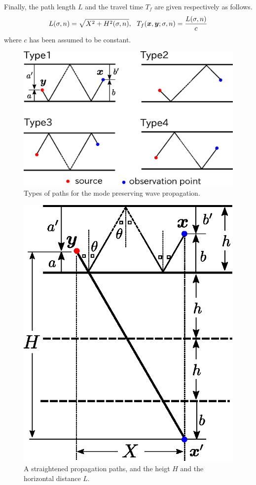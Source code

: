 ﻿\documentclass[11pt,a4j]{article}
\begin{document}
Finally, the path length $L$ and the travel time $T_f$ are 
 given respectively as follows.
\begin{equation}
	L(\sigma ,n)=\sqrt{X^2+ H^2(\sigma ,n)}, \ \ 
	T_f(\fat{x},\fat{y};\sigma,n)=\frac{L(\sigma,n)}{c}
	\label{eqn:}
\end{equation}
where $c$ has been assumed to be constant.
\begin{figure}[h]
	\begin{center}
	\includegraphics[width=0.7\linewidth]{paths.eps} 
	\end{center}
	\caption{
		Types of paths for the mode preserving wave propagation. 
	} 
	\label{fig:fig1}
\end{figure}
\begin{figure}[h]
	\begin{center}
	\includegraphics[width=0.5\linewidth]{length.eps} 
	\end{center}
	\caption{
		A straightened propagation paths, and the heigt $H$ and the 
		horizontal distance $L$.
	} 
	\label{fig:fig2}
\end{figure}
\end{document}
